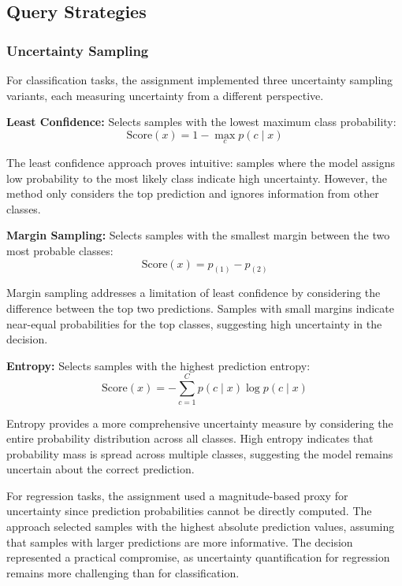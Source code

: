 \documentclass[conference]{IEEEtran}
\begin{document}
\subsection{Query Strategies}

\subsubsection{Uncertainty Sampling}

For classification tasks, the assignment implemented three uncertainty sampling variants, each measuring uncertainty from a different perspective.

\textbf{Least Confidence:} Selects samples with the lowest maximum class probability:
\begin{equation}
\text{Score}(x) = 1 - \max_c p(c \mid x)
\end{equation}

The least confidence approach proves intuitive: samples where the model assigns low probability to the most likely class indicate high uncertainty. However, the method only considers the top prediction and ignores information from other classes.

\textbf{Margin Sampling:} Selects samples with the smallest margin between the two most probable classes:
\begin{equation}
\text{Score}(x) = p_{(1)} - p_{(2)}
\end{equation}

Margin sampling addresses a limitation of least confidence by considering the difference between the top two predictions. Samples with small margins indicate near-equal probabilities for the top classes, suggesting high uncertainty in the decision.

\textbf{Entropy:} Selects samples with the highest prediction entropy:
\begin{equation}
\text{Score}(x) = -\sum_{c=1}^C p(c \mid x) \log p(c \mid x)
\end{equation}

Entropy provides a more comprehensive uncertainty measure by considering the entire probability distribution across all classes. High entropy indicates that probability mass is spread across multiple classes, suggesting the model remains uncertain about the correct prediction.

For regression tasks, the assignment used a magnitude-based proxy for uncertainty since prediction probabilities cannot be directly computed. The approach selected samples with the highest absolute prediction values, assuming that samples with larger predictions are more informative. The decision represented a practical compromise, as uncertainty quantification for regression remains more challenging than for classification.
\end{document}
